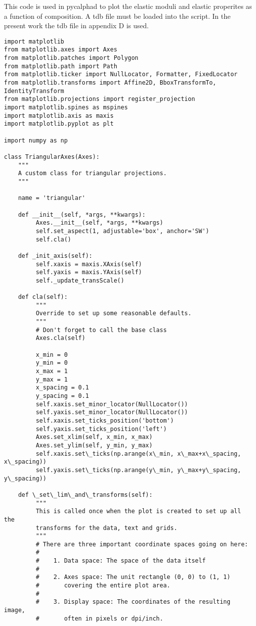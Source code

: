 
\noindent This code is used in pycalphad to plot the elastic moduli and elastic properites as a function of composition. A tdb file must be loaded into the script. In the present work the tdb file in appendix D is used.
{\lstset{language=Python}
\footnotesize
\begin{lstlisting}
import matplotlib
from matplotlib.axes import Axes
from matplotlib.patches import Polygon
from matplotlib.path import Path
from matplotlib.ticker import NullLocator, Formatter, FixedLocator
from matplotlib.transforms import Affine2D, BboxTransformTo, IdentityTransform
from matplotlib.projections import register_projection
import matplotlib.spines as mspines
import matplotlib.axis as maxis
import matplotlib.pyplot as plt

import numpy as np

class TriangularAxes(Axes):
    """
    A custom class for triangular projections.
    """

    name = 'triangular'

    def __init__(self, *args, **kwargs):
         Axes.__init__(self, *args, **kwargs)
         self.set_aspect(1, adjustable='box', anchor='SW')
         self.cla()

    def _init_axis(self):
         self.xaxis = maxis.XAxis(self)
         self.yaxis = maxis.YAxis(self)
         self._update_transScale()

    def cla(self):
         """
         Override to set up some reasonable defaults.
         """
         # Don't forget to call the base class
         Axes.cla(self)

         x_min = 0
         y_min = 0
         x_max = 1
         y_max = 1
         x_spacing = 0.1
         y_spacing = 0.1
         self.xaxis.set_minor_locator(NullLocator())
         self.yaxis.set_minor_locator(NullLocator())
         self.xaxis.set_ticks_position('bottom')
         self.yaxis.set_ticks_position('left')
         Axes.set_xlim(self, x_min, x_max)
         Axes.set_ylim(self, y_min, y_max)
         self.xaxis.set\_ticks(np.arange(x\_min, x\_max+x\_spacing, x\_spacing))
         self.yaxis.set\_ticks(np.arange(y\_min, y\_max+y\_spacing, y\_spacing))

    def \_set\_lim\_and\_transforms(self):
         """
         This is called once when the plot is created to set up all the
         transforms for the data, text and grids.
         """
         # There are three important coordinate spaces going on here:
         #
         #    1. Data space: The space of the data itself
         #
         #    2. Axes space: The unit rectangle (0, 0) to (1, 1)
         #       covering the entire plot area.
         #
         #    3. Display space: The coordinates of the resulting image,
         #       often in pixels or dpi/inch.


\end{lstlisting}}
